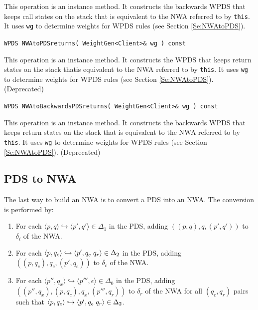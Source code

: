 \begin{description}
    This operation is an instance method.  It constructs the backwards WPDS
    that keeps call states on the stack that is equivalent to the NWA
    referred to by \texttt{this}.  It uses \texttt{wg} to determine weights
    for WPDS rules (see Section \ref{Se:NWAtoPDS}).

  \item\texttt{WPDS NWAtoPDSreturns( WeightGen<Client>\& wg ) const} \nopagebreak

    This operation is an instance method.  It constructs the WPDS that keeps
    return states on the stack thatis equivalent to the NWA referred to by
    \texttt{this}.  It uses \texttt{wg} to determine weights for WPDS rules
    (see Section \ref{Se:NWAtoPDS}).  (Deprecated)

  \item\texttt{WPDS NWAtoBackwardsPDSreturns( WeightGen<Client>\& wg ) const} \nopagebreak

    This operation is an instance method.  It constructs the backwards WPDS
    that keeps return states on the stack that is equivalent to the NWA
    referred to by \texttt{this}.  It uses \texttt{wg} to determine weights
    for WPDS rules (see Section \ref{Se:NWAtoPDS}).  (Deprecated) \\

\end{description}

\subsection{PDS to NWA}
\label{Se:PDStoNWA}

The last way to build an NWA is to convert a PDS into an NWA.  The conversion
is performed by:

\begin{enumerate}

\item For each $\langle p,q \rangle \hookrightarrow \langle p',q' \rangle \in
  \Delta_1$ in the PDS, adding $( (p,q), q, (p',q') )$ to $\delta_i$ of the
  NWA.

\item For each $\langle p,q_c \rangle \hookrightarrow \langle
  p',q_e \hspace{.1cm} q_r \rangle \in \Delta_2$ in the PDS, adding $(
  (p,q_c), q_c, (p',q_e) )$ to $\delta_c$ of the NWA.

\item For each $\langle p'',q_x \rangle \hookrightarrow \langle p''',\epsilon
  \rangle \in \Delta_0$ in the PDS, adding $( (p'',q_x), (p,q_c), q_x,
  (p''',q_r) )$ to $\delta_r$ of the NWA for all $(q_c,q_r)$ pairs such that
  $\langle p,q_c \rangle \hookrightarrow \langle p',q_e \hspace{.1cm} q_r
  \rangle \in \Delta_2$.

\end{enumerate}

